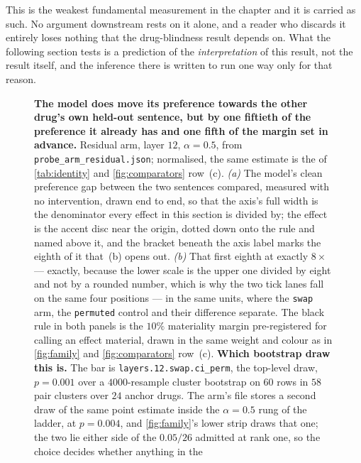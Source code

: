 \begin{scopelimit}
This is the weakest fundamental measurement in the chapter and it is carried as
such. No argument downstream rests on it alone, and a reader who discards it
entirely loses nothing that the drug-blindness result depends on. What the
following section tests is a prediction of the \emph{interpretation} of this
result, not the result itself, and the inference there is written to run one way
only for that reason.
\end{scopelimit}

\begin{figure}[htbp]
\centering

\caption[The effect and its gap]{\textbf{The model does move its preference
towards the other drug's own held-out sentence, but by one fiftieth of the
preference it already has and one fifth of the margin set in advance.}
Residual arm, layer $12$, $\alpha = 0.5$, from
\texttt{probe\_arm\_residual.json}; normalised, the same estimate is the
 of \cref{tab:identity} and
\cref{fig:comparators} row~(c). \emph{(a)} The model's clean preference gap
between the two sentences compared, measured with no intervention, drawn end to
end, so that the axis's full width is the denominator every effect in this
section is divided by; the effect is the accent disc near the origin, dotted
down onto the rule and named above it, and the bracket beneath the axis label
marks the eighth of it that~(b) opens out. \emph{(b)} That first eighth at
exactly $8\times$ --- exactly, because the lower scale is the upper one divided
by eight and not by a rounded number, which is why the two tick lanes fall on
the same four positions --- in the same units, where the \texttt{swap} arm, the
\texttt{permuted} control and their difference separate. The black rule in both
panels is the $10\%$ materiality margin pre-registered for calling an effect
material, drawn in the same weight and colour as in \cref{fig:family} and
\cref{fig:comparators} row~(c). \textbf{Which bootstrap draw this is.} The bar
is \texttt{layers.12.swap.ci\_perm}, the top-level draw, $p = 0.001$ over a
$4000$-resample cluster bootstrap on $60$ rows in $58$ pair clusters over $24$
anchor drugs. The arm's file stores a second draw of the same point estimate
inside the $\alpha = 0.5$ rung of the ladder, at $p = 0.004$, and
\cref{fig:family}'s lower strip draws that one; the two lie either side of the
$0.05/26$ admitted at rank one, so the choice decides whether anything in the
}
\end{figure}
